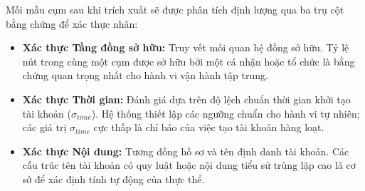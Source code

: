 Mỗi mẫu cụm sau khi trích xuất sẽ được phân tích định lượng qua ba trụ cột bằng chứng để xác thực nhãn:
\begin{itemize}[label={--}, itemsep=1pt]
    \item \textbf{Xác thực Tầng đồng sở hữu:} Truy vết mối quan hệ đồng sở hữu. Tỷ lệ nút trong cùng một cụm được sở hữu bởi một cá nhận hoặc tổ chức là bằng chứng quan trọng nhất cho hành vi vận hành tập trung.
    \item \textbf{Xác thực Thời gian:} Đánh giá dựa trên độ lệch chuẩn thời gian khởi tạo tài khoản ($\sigma_{time}$). Hệ thống thiết lập các ngưỡng chuẩn cho hành vi tự nhiên; các giá trị $\sigma_{time}$ cực thấp là chỉ báo của việc tạo tài khoản hàng loạt.
    \item \textbf{Xác thực Nội dung:} Tương đồng hồ sơ và tên định danh tài khoản. Các cấu trúc tên tài khoản có quy luật hoặc nội dung tiểu sử trùng lặp cao là cơ sở để xác định tính tự động của thực thể.
\end{itemize}